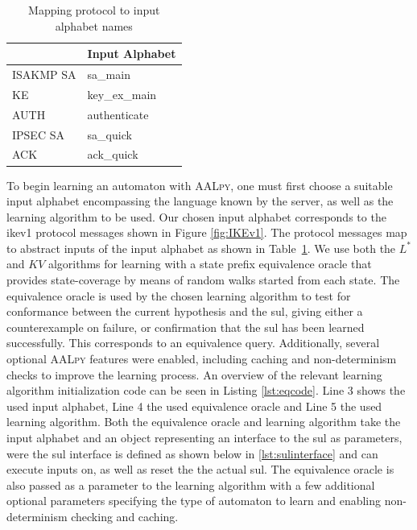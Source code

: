 \begin{table}[h]
	\centering
	\begin{tabular}{|l|l|}
		\hline
		\rowcolor[HTML]{DAE8FC} 
		\hline
		\multicolumn{1}{|l|}{\cellcolor[HTML]{DAE8FC}\textbf{Protocol}} & \multicolumn{1}{l|}{\cellcolor[HTML]{DAE8FC}\textbf{Input Alphabet}} \\ \hline
		ISAKMP SA                                                       & sa\_main                                                             \\
		KE                                                              & key\_ex\_main                                                        \\
		AUTH                                                            & authenticate                                                         \\
		IPSEC SA                                                        & sa\_quick                                                            \\
		ACK                                                             & ack\_quick                                                           \\ \hline
	\end{tabular}
	\caption{Mapping protocol to input alphabet names}
	\label{tab:map_prot_ia}
\end{table}

To begin learning an automaton with \textsc{AALpy}, one must first choose a suitable input alphabet encompassing the language known by the server, as well as the learning algorithm to be used. Our chosen input alphabet corresponds to the \ac{ike}v1 protocol messages shown in Figure \ref{fig:IKEv1}. The protocol messages map to abstract inputs of the input alphabet as shown in Table~\ref{tab:map_prot_ia}. We use both the $L^*$ and $KV$ algorithms for learning with a state prefix equivalence oracle that provides state-coverage by means of random walks started from each state. The equivalence oracle is used by the chosen learning algorithm to test for conformance between the current hypothesis and the \ac{sul}, giving either a counterexample on failure, or confirmation that the \ac{sul} has been learned successfully. This corresponds to an equivalence query. Additionally, several optional \textsc{AALpy} features were enabled, including caching and non-determinism checks to improve the learning process. An overview of the relevant learning algorithm initialization code can be seen in Listing \ref{lst:eqcode}. Line 3 shows the used input alphabet, Line 4 the used equivalence oracle and Line 5 the used learning algorithm. Both the equivalence oracle and learning algorithm take the input alphabet and an object representing an interface to the \ac{sul} as parameters, were the \ac{sul} interface is defined as shown below in \ref{lst:sulinterface} and can execute inputs on, as well as reset the the actual \ac{sul}. The equivalence oracle is also passed as a parameter to the learning algorithm with a few additional optional parameters specifying the type of automaton to learn and enabling non-determinism checking and caching.


